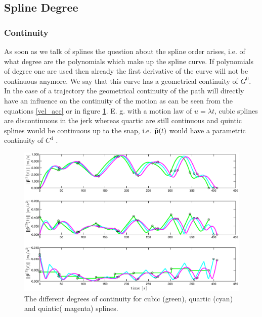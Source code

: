 \subsection{Spline Degree}

\subsubsection{Continuity}
As soon as we talk of splines the question about the spline order arises, i.e. of what degree are the polynomials which make up the spline curve. If polynomials of degree one are used then already the first derivative of the curve will not be continuous anymore. We say that this curve has a geometrical continuity of $G^0$. In the case of a trajectory the geometrical continuity of the path will directly have an influence on the continuity of the motion as can be seen from the equations \eqref{vel_acc} or in figure \ref{fig:continuity}. E. g. with a motion law of $u=\lambda t$, cubic splines are discontinuous in the jerk whereas quartic are still continuous and quintic splines would be continuous up to the snap, i.e. ${\bf \tilde{p}}(t)$ would have a parametric continuity of $C^4$ . 

\begin{figure}[H]
	\centering
    \includegraphics[width = \textwidth]{graphics/continuity.eps}
  \caption{The different degrees of continuity for cubic (green), quartic (cyan) and quintic( magenta) splines.}
  \label{fig:continuity}
\end{figure}



